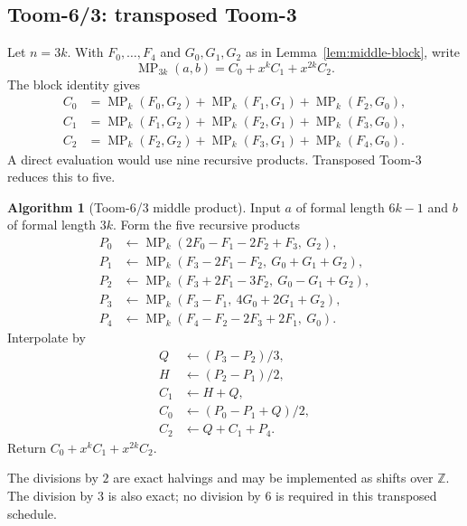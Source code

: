 \documentclass[11pt]{book}
\theoremstyle{definition}
\newtheorem{algorithm}[theorem]{Algorithm}
\newcommand{\ZZ}{\mathbb Z}
\begin{document}
\subsection{Toom-6/3: transposed Toom-3}

Let $n=3k$.  With $F_0,\ldots,F_4$ and $G_0,G_1,G_2$ as in
Lemma~\ref{lem:middle-block}, write
\[
 \operatorname{MP}_{3k}(a,b)=C_0+x^kC_1+x^{2k}C_2.
\]
The block identity gives
\begin{align}
 C_0&=\operatorname{MP}_k(F_0,G_2)
      +\operatorname{MP}_k(F_1,G_1)
      +\operatorname{MP}_k(F_2,G_0),\label{eq:t63-c0}\\
 C_1&=\operatorname{MP}_k(F_1,G_2)
      +\operatorname{MP}_k(F_2,G_1)
      +\operatorname{MP}_k(F_3,G_0),\label{eq:t63-c1}\\
 C_2&=\operatorname{MP}_k(F_2,G_2)
      +\operatorname{MP}_k(F_3,G_1)
      +\operatorname{MP}_k(F_4,G_0).\label{eq:t63-c2}
\end{align}
A direct evaluation would use nine recursive products.  Transposed Toom-3
reduces this to five.

\begin{algorithm}[Toom-6/3 middle product]\label{alg:middle-toom63}
Input $a$ of formal length $6k-1$ and $b$ of formal length $3k$.
Form the five recursive products
\begin{align*}
 P_0&\leftarrow\operatorname{MP}_k
 (2F_0-F_1-2F_2+F_3,\ G_2),\\
 P_1&\leftarrow\operatorname{MP}_k
 (F_3-2F_1-F_2,\ G_0+G_1+G_2),\\
 P_2&\leftarrow\operatorname{MP}_k
 (F_3+2F_1-3F_2,\ G_0-G_1+G_2),\\
 P_3&\leftarrow\operatorname{MP}_k
 (F_3-F_1,\ 4G_0+2G_1+G_2),\\
 P_4&\leftarrow\operatorname{MP}_k
 (F_4-F_2-2F_3+2F_1,\ G_0).
\end{align*}
Interpolate by
\begin{align*}
 Q&\leftarrow(P_3-P_2)/3,\\
 H&\leftarrow(P_2-P_1)/2,\\
 C_1&\leftarrow H+Q,\\
 C_0&\leftarrow(P_0-P_1+Q)/2,\\
 C_2&\leftarrow Q+C_1+P_4.
\end{align*}
Return $C_0+x^kC_1+x^{2k}C_2$.
\end{algorithm}

The divisions by $2$ are exact halvings and may be implemented as shifts over
$\ZZ$.  The division by $3$ is also exact; no division by $6$ is required in
this transposed schedule.
\end{document}
